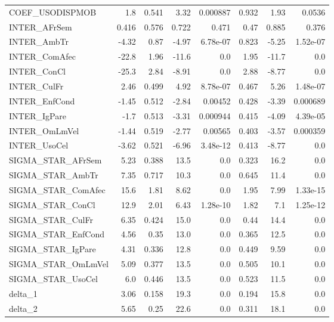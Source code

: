 \begin{tabular}{lrrrrrrr}
COEF\_USODISPMOB    &     1.8 &    0.541 &    3.32 & 0.000887 &         0.932 &         1.93 &        0.0536 \\
INTER\_AFrSem       &   0.416 &    0.576 &   0.722 &    0.471 &          0.47 &        0.885 &         0.376 \\
INTER\_AmbTr        &   -4.32 &     0.87 &   -4.97 & 6.78e-07 &         0.823 &        -5.25 &      1.52e-07 \\
INTER\_ComAfec      &   -22.8 &     1.96 &   -11.6 &      0.0 &          1.95 &        -11.7 &           0.0 \\
INTER\_ConCl        &   -25.3 &     2.84 &   -8.91 &      0.0 &          2.88 &        -8.77 &           0.0 \\
INTER\_CulFr        &    2.46 &    0.499 &    4.92 & 8.78e-07 &         0.467 &         5.26 &      1.48e-07 \\
INTER\_EnfCond      &   -1.45 &    0.512 &   -2.84 &  0.00452 &         0.428 &        -3.39 &      0.000689 \\
INTER\_IgPare       &    -1.7 &    0.513 &   -3.31 & 0.000944 &         0.415 &        -4.09 &      4.39e-05 \\
INTER\_OmLmVel      &   -1.44 &    0.519 &   -2.77 &  0.00565 &         0.403 &        -3.57 &      0.000359 \\
INTER\_UsoCel       &   -3.62 &    0.521 &   -6.96 & 3.48e-12 &         0.413 &        -8.77 &           0.0 \\
SIGMA\_STAR\_AFrSem  &    5.23 &    0.388 &    13.5 &      0.0 &         0.323 &         16.2 &           0.0 \\
SIGMA\_STAR\_AmbTr   &    7.35 &    0.717 &    10.3 &      0.0 &         0.645 &         11.4 &           0.0 \\
SIGMA\_STAR\_ComAfec &    15.6 &     1.81 &    8.62 &      0.0 &          1.95 &         7.99 &      1.33e-15 \\
SIGMA\_STAR\_ConCl   &    12.9 &     2.01 &    6.43 & 1.28e-10 &          1.82 &          7.1 &      1.25e-12 \\
SIGMA\_STAR\_CulFr   &    6.35 &    0.424 &    15.0 &      0.0 &          0.44 &         14.4 &           0.0 \\
SIGMA\_STAR\_EnfCond &    4.56 &     0.35 &    13.0 &      0.0 &         0.365 &         12.5 &           0.0 \\
SIGMA\_STAR\_IgPare  &    4.31 &    0.336 &    12.8 &      0.0 &         0.449 &         9.59 &           0.0 \\
SIGMA\_STAR\_OmLmVel &    5.09 &    0.377 &    13.5 &      0.0 &         0.505 &         10.1 &           0.0 \\
SIGMA\_STAR\_UsoCel  &     6.0 &    0.446 &    13.5 &      0.0 &         0.523 &         11.5 &           0.0 \\
delta\_1            &    3.06 &    0.158 &    19.3 &      0.0 &         0.194 &         15.8 &           0.0 \\
delta\_2            &    5.65 &     0.25 &    22.6 &      0.0 &         0.311 &         18.1 &           0.0 \\
\bottomrule
\end{tabular}

